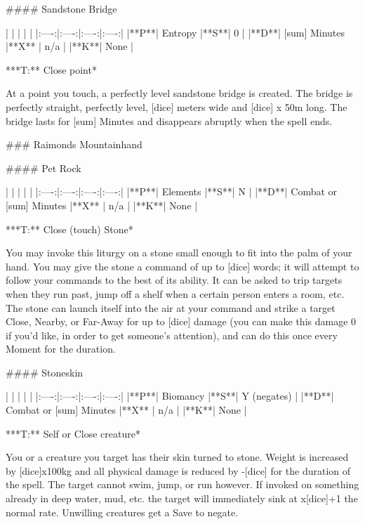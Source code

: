 #### Sandstone Bridge

| | | | |
|:----:|:----:|:----:|:----:|
|**P**| Entropy |**S**|  0 |
|**D**| [sum] Minutes |**X** |  n/a  |
|**K**| None |


***T:**   Close point*



At a point you touch, a perfectly level sandstone bridge is created.  The bridge is perfectly straight, perfectly level, [dice] meters wide and [dice] x 50m long.  The bridge lasts for [sum] Minutes and disappears abruptly when the spell ends.


### Raimonds Mountainhand





#### Pet Rock

| | | | |
|:----:|:----:|:----:|:----:|
|**P**| Elements |**S**|  N |
|**D**| Combat or [sum] Minutes |**X** |  n/a  |
|**K**| None |


***T:**   Close (touch) Stone*



You may invoke this liturgy on a stone small enough to fit into the palm of your hand.  You may give the stone a command of up to [dice] words; it will attempt to follow your commands to the best of its ability.  It can be asked to trip targets when they run past, jump off a shelf when a certain person enters a room, etc.  The stone can launch itself into the air at your command and strike a target Close, Nearby, or Far-Away for up to [dice] damage (you can make this damage 0 if you'd like, in order to get someone's attention), and can do this once every Moment for the duration.




#### Stoneskin

| | | | |
|:----:|:----:|:----:|:----:|
|**P**| Biomancy |**S**|  Y (negates) |
|**D**| Combat or [sum] Minutes |**X** |  n/a  |
|**K**| None |


***T:**   Self or Close creature*



You or a creature you target has their skin turned to stone.  Weight is increased by [dice]x100kg and all physical damage is reduced by -[dice] for the duration of the spell.  The target cannot swim, jump, or run however. If invoked on something already in deep water, mud, etc. the target will immediately sink at x[dice]+1 the normal rate. Unwilling creatures get a Save to negate. 





